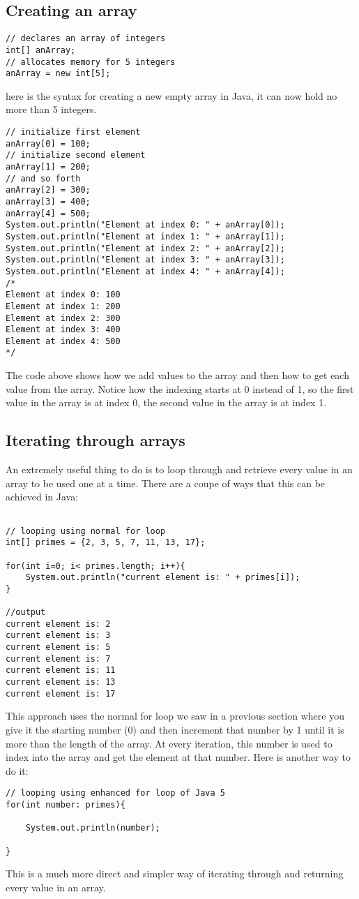 \documentclass[14pt]{extreport}%
\begin{document}
\subsection*{Creating an array}
\begin{lstlisting}
// declares an array of integers
int[] anArray;
// allocates memory for 5 integers
anArray = new int[5];
\end{lstlisting}{}
here is the syntax for creating a new empty array in Java, it can now hold no more than 5 integers.
\begin{lstlisting}
// initialize first element
anArray[0] = 100;
// initialize second element
anArray[1] = 200;
// and so forth
anArray[2] = 300;
anArray[3] = 400;
anArray[4] = 500;
System.out.println("Element at index 0: " + anArray[0]);
System.out.println("Element at index 1: " + anArray[1]);
System.out.println("Element at index 2: " + anArray[2]);
System.out.println("Element at index 3: " + anArray[3]);
System.out.println("Element at index 4: " + anArray[4]);
/*
Element at index 0: 100
Element at index 1: 200
Element at index 2: 300
Element at index 3: 400
Element at index 4: 500
*/
\end{lstlisting}{}
The code above shows how we add values to the array and then how to get each value from the array. Notice how the indexing starts at 0 instead of 1, so the first value in the array is at index 0, the second value in the array is at index 1. 

\subsection*{Iterating through arrays}
An extremely useful thing to do is to loop through and retrieve every value in an array to be used one at a time. There are a coupe of ways that this can be achieved in Java:
\begin{lstlisting}

// looping using normal for loop
int[] primes = {2, 3, 5, 7, 11, 13, 17}; 
 
for(int i=0; i< primes.length; i++){ 
    System.out.println("current element is: " + primes[i]); 
}

//output
current element is: 2 
current element is: 3 
current element is: 5 
current element is: 7 
current element is: 11 
current element is: 13 
current element is: 17
\end{lstlisting}{}
This approach uses the normal for loop we saw in a previous section where you give it the starting number (0) and then increment that number by 1 until it is more than the length of the array. At every iteration, this number is used to index into the array and get the element at that number. Here is another way to do it:
\begin{lstlisting}
// looping using enhanced for loop of Java 5 
for(int number: primes){ 

    System.out.println(number); 
    
}
\end{lstlisting}{}
This is a much more direct and simpler way of iterating through and returning every value in an array.
\end{document}

